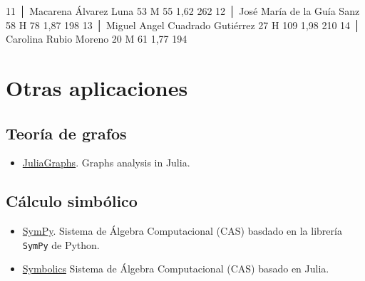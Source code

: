 \documentclass[
  letterpaper,
  DIV=11,
  numbers=noendperiod]{scrreprt}
\newenvironment{Shaded}{\begin{snugshade}}{\end{snugshade}}
\newcommand{\FloatTok}[1]{\textcolor[rgb]{0.68,0.00,0.00}{#1}}
\newcommand{\NormalTok}[1]{\textcolor[rgb]{0.00,0.23,0.31}{#1}}
\providecommand{\tightlist}{%
  \setlength{\itemsep}{0pt}\setlength{\parskip}{0pt}}\usepackage{longtable,booktabs,array}
\begin{document}
\begin{Shaded}
\begin{Highlighting}[]
  \FloatTok{11}\NormalTok{ │ Macarena Álvarez Luna               }\FloatTok{53}\NormalTok{  M             }\FloatTok{55}  \FloatTok{1}\NormalTok{,}\FloatTok{62}            \FloatTok{262}
  \FloatTok{12}\NormalTok{ │ José María de la Guía Sanz          }\FloatTok{58}\NormalTok{  H             }\FloatTok{78}  \FloatTok{1}\NormalTok{,}\FloatTok{87}            \FloatTok{198}
  \FloatTok{13}\NormalTok{ │ Miguel Angel Cuadrado Gutiérrez     }\FloatTok{27}\NormalTok{  H            }\FloatTok{109}  \FloatTok{1}\NormalTok{,}\FloatTok{98}            \FloatTok{210}
  \FloatTok{14}\NormalTok{ │ Carolina Rubio Moreno               }\FloatTok{20}\NormalTok{  M             }\FloatTok{61}  \FloatTok{1}\NormalTok{,}\FloatTok{77}            \FloatTok{194}
\end{Highlighting}
\end{Shaded}


\hypertarget{otras-aplicaciones}{%
\chapter{Otras aplicaciones}\label{otras-aplicaciones}}

\hypertarget{teoruxeda-de-grafos}{%
\section{Teoría de grafos}\label{teoruxeda-de-grafos}}

\begin{itemize}
\tightlist
\item
  \href{https://juliagraphs.org/}{JuliaGraphs}. Graphs analysis in
  Julia.
\end{itemize}

\hypertarget{cuxe1lculo-simbuxf3lico-1}{%
\section{Cálculo simbólico}\label{cuxe1lculo-simbuxf3lico-1}}

\begin{itemize}
\tightlist
\item
  \href{https://docs.juliahub.com/SymPy/KzewI/1.0.31/}{SymPy}. Sistema
  de Álgebra Computacional (CAS) basdado en la librería \texttt{SymPy}
  de Python.
\item
  \href{https://juliasymbolics.org/}{Symbolics} Sistema de Álgebra
  Computacional (CAS) basado en Julia.
\end{itemize}
\end{document}
